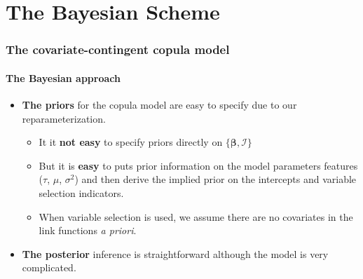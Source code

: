\documentclass{beamer}
\begin{document}
\begin{frame}[allowframebreaks]
\begin{itemize}

  \end{itemize}
\end{frame}

\section{The Bayesian Scheme}

\begin{frame}
  \frametitle{The covariate-contingent copula model}
  \framesubtitle{The Bayesian approach}
  \begin{itemize}

  \item \textbf{The priors} for the copula model are easy to specify due to our
    reparameterization.

    \begin{itemize}

    \item It it \textbf{not easy} to specify priors directly on
      $\{\bm{\beta},\bm{\mathcal{I}}\}$

    \item But it is \textbf{easy} to puts prior information on the model parameters
      features ($\tau$, $\mu$, $\sigma^2$) and then derive the implied prior on the
      intercepts and variable selection indicators.

    \item When variable selection is used, we assume there are no covariates in
      the link functions \emph{a priori}.

    \end{itemize}

  \item \textbf{The posterior} inference is straightforward although the model is very
    complicated.
  \end{itemize}
\end{frame}
\end{document}
